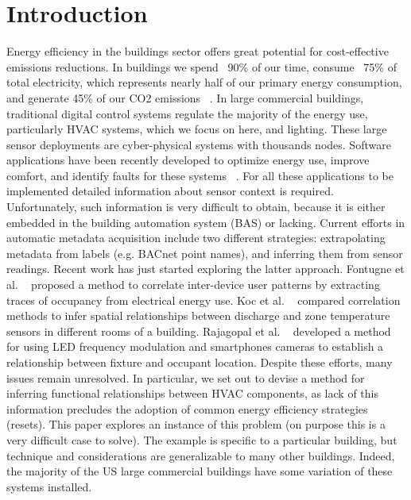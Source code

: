 \section{Introduction}
Energy efficiency in the buildings sector offers great potential for cost-effective emissions reductions. In buildings we spend ~90\% of our time, consume ~75\% of total electricity, which represents nearly half of our primary energy consumption, and generate 45\% of our CO2 emissions ~\cite{efficiency2009buildings}. In large commercial buildings, traditional digital control systems regulate the majority of the energy use, particularly HVAC systems, which we focus on here, and lighting. These large sensor deployments are cyber-physical systems with thousands nodes. 
Software applications have been recently developed to optimize energy use, improve comfort, and identify faults for these systems ~\cite{krioukov2012building,dawson2013boss,weng2013buildingdepot,arjunan2012sensoract,wheeler1992understanding}. For all these applications to be implemented detailed information about sensor context is required. Unfortunately, such information is very difficult to obtain, because it is either embedded in the building automation system (BAS) or lacking. Current efforts in automatic metadata acquisition include two different strategies: extrapolating metadata from labels (e.g. BACnet point names), and inferring them from sensor readings. Recent work has just started exploring the latter approach. Fontugne et al. ~\cite{EMD} proposed a method to correlate inter-device user patterns by extracting traces of occupancy from electrical energy use. Koc et al. ~\cite{koc2014comparison} compared correlation methods to infer spatial relationships between discharge and zone temperature sensors in different rooms of a building. Rajagopal et al. ~\cite{rajagopal2014visual} developed a method for using LED frequency modulation and smartphones cameras to establish a relationship between fixture and occupant location.
Despite these efforts, many issues remain unresolved. In particular, we set out to devise a method for inferring functional relationships between HVAC components, as lack of this information precludes the adoption of common energy efficiency strategies (resets). This paper explores an instance of this problem (on purpose this is a very difficult case to solve). The example is specific to a particular building, but technique and considerations are generalizable to many other buildings. Indeed, the majority of the US large commercial buildings have some variation of these systems installed.
